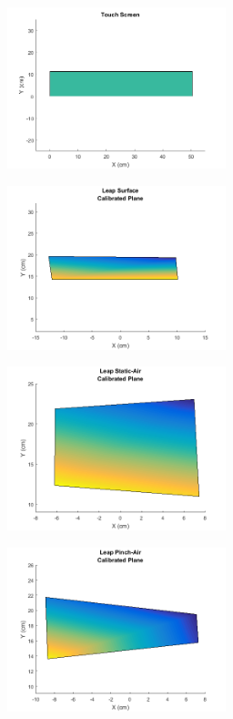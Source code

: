 \begin{figure}[h]
	\centering
	\begin{minipage}[t]{2.5in}
		\includegraphics[width=2.5in]{fig_calibration_touch}
		\label{fig_calibration_touch}
	\end{minipage}
	\begin{minipage}[t]{2.5in}
		\includegraphics[width=2.5in]{fig_calibration_surface}
		\label{fig_calibration_surface}
	\end{minipage}
	\begin{minipage}[t]{2.5in}
		\includegraphics[width=2.5in]{fig_calibration_static}
		\label{fig_calibration_static}
	\end{minipage}
	\begin{minipage}[t]{2.5in}
		\includegraphics[width=2.5in]{fig_calibration_pinch}

\end{minipage}
\end{figure}
